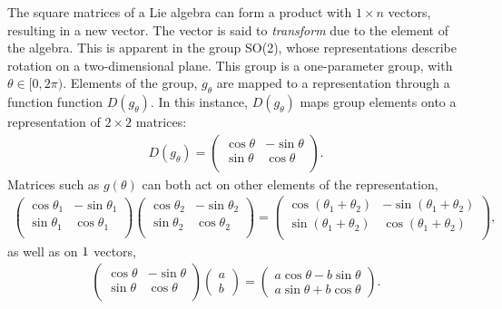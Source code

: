 The square \nxn matrices of a Lie algebra can form a product with $1\times n$ vectors, resulting in a new vector. 
The vector is said to \emph{transform} due to the element of the algebra.
This is apparent in the group SO(2), whose representations describe rotation on a two-dimensional plane.
This group is a one-parameter group, with $\theta\in[0,2\pi)$.
Elements of the group, $g_\theta$ are mapped to a representation through a function function $D(g_\theta)$.
In this instance, $D(g_\theta)$ maps group elements onto a representation of $2\times2$ matrices:
\begin{equation}\begin{split}\label{eqn:so2Rep}
    D(g_\theta) = \begin{pmatrix}
        \cos\theta &-\sin\theta \\
        \sin\theta & \cos\theta \\
    \end{pmatrix}.
\end{split}\end{equation} 
Matrices such as $g(\theta)$ can both act on other elements of the representation, 
\begin{equation}\begin{split}
    \begin{pmatrix}
        \cos\theta_1 &-\sin\theta_1 \\
        \sin\theta_1 & \cos\theta_1 \\
    \end{pmatrix}
    \begin{pmatrix}
        \cos\theta_2 &-\sin\theta_2 \\
        \sin\theta_2 & \cos\theta_2 \\
    \end{pmatrix}
    =
    \begin{pmatrix}
        \cos(\theta_1+\theta_2) &-\sin(\theta_1+\theta_2) \\
        \sin(\theta_1+\theta_2) & \cos(\theta_1+\theta_2) \\
    \end{pmatrix},
\end{split}\end{equation} 
as well as on $1\time2$ vectors,
\begin{equation}\begin{split}
    \begin{pmatrix}
        \cos\theta &-\sin\theta \\
        \sin\theta & \cos\theta \\
    \end{pmatrix}
    \begin{pmatrix}a\\b\end{pmatrix}
    =
    \begin{pmatrix}a\cos\theta-b\sin\theta\\a\sin\theta+b\cos\theta\end{pmatrix}.
\end{split}\end{equation} 
